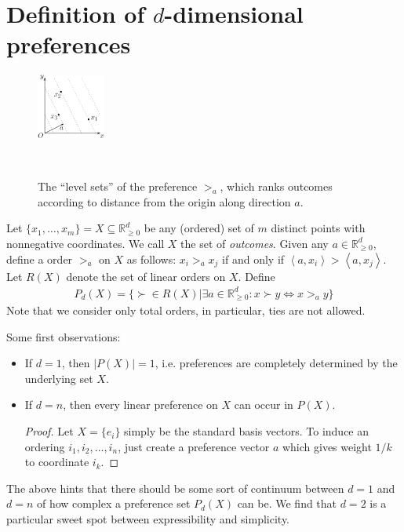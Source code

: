 \documentclass[12pt]{article}
\newcommand{\Rgz}{\mathbb{R}_{\ge 0}}
\newcommand{\ip}[2]{\left\langle{#1},{#2}\right\rangle}
\newcommand{\1}[1]{\mathds{1}[{#1}]}
\begin{document}
\section{Definition of $d$-dimensional preferences}
  \begin{figure}
    \vspace{-0.7in}
    \begin{center}
      \includegraphics[width=0.2\textwidth]{figures/def2DPref}
    \end{center}
    \ \caption{
      The ``level sets'' of the preference $>_a$,
      which ranks outcomes according to distance from the origin along
      direction $a$.
    }
  \end{figure}
  Let $\{x_1,\ldots,x_m\} = X\subseteq \Rgz^d$ be any (ordered) set of
  $m$ distinct points with nonnegative coordinates.
  We call $X$ the set of \emph{outcomes}.
  Given any $a\in \Rgz^d$, define a order $>_a$ on $X$ as follows:
  $x_i >_a x_j$ if and only if $\ip{a}{x_i} > \ip{a}{x_j}$.
  Let $R(X)$ denote the set of linear orders on $X$.
  Define
  \begin{align*}
    P_d(X) = \{ \succ \in R(X) | \exists a\in\Rgz^d: x \succ y \iff x >_a y\}
  \end{align*}
  Note that we consider only total orders, in particular,
  ties are not allowed.

  Some first observations:
  \begin{itemize}
    \item If $d=1$, then $|P(X)| = 1$, i.e. preferences are completely
      determined by the underlying set $X$.
    \item If $d=n$, then every linear preference on $X$ can occur in $P(X)$.
      \begin{proof}
        Let $X = \{e_i\}$ simply be the standard basis vectors.
        To induce an ordering $i_1, i_2, \ldots, i_n$, just create a preference
        vector $a$ which gives weight $1/k$ to coordinate $i_k$.
      \end{proof}
  \end{itemize}
  The above hints that there should be some sort of continuum between $d=1$
  and $d=n$ of how complex a preference set $P_d(X)$ can be.
  We find that $d=2$ is a particular sweet spot between expressibility and
  simplicity.
\end{document}
